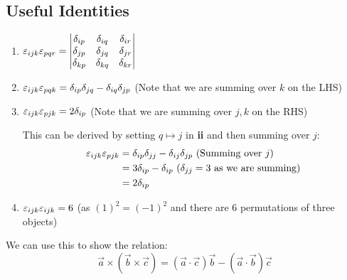 \documentclass[../main.tex]{subfiles}
\begin{document}
\subsection{Useful Identities}
\begin{enumerate}
  \item $\varepsilon_{ijk} \varepsilon_{pqr} =
      \begin{vmatrix}
      \delta_{i p} & \delta_{i q} & \delta_{i r} \\
      \delta_{j p} & \delta_{j q} & \delta_{j r} \\
      \delta_{k p} & \delta_{k q} & \delta_{k r} \\
      \end{vmatrix}$
  \item $\varepsilon_{ijk} \varepsilon_{pqk} = \delta_{i p} \delta_{j q} - \delta_{i q} \delta_{j p}$ (Note that we are summing over $k$ on the LHS)
  \item $\varepsilon_{ijk} \varepsilon_{pjk} = 2\delta_{i p}$ (Note that we are summing over $j, k$ on the RHS)\par
      This can be derived by setting $q \mapsto j$ in \textbf{ii} and then summing over $j$:
      \begin{align*}
        \varepsilon_{i j k}\varepsilon_{p j k} &= \delta_{i p}\delta_{j j} - \delta_{i j}\delta_{j p} \text{ (Summing over $j$)}\\
                                   &= 3\delta_{i p} - \delta_{i p} \text{ ($\delta_{j j} = 3$ as we are summing)}\\
                                   &= 2\delta_{i p}
      \end{align*}
  \item $\varepsilon_{ijk} \varepsilon_{ijk} = 6$ (as $(1)^2 = (-1)^2$ and there are 6 permutations of three objects)
\end{enumerate}
We can use this to show the relation:
\[
  \vec{a} \times (\vec{b} \times \vec{c}) = (\vec{a} \cdot \vec{c})\vec{b} - (\vec{a} \cdot \vec{b})\vec{c}
\]
\end{document}

